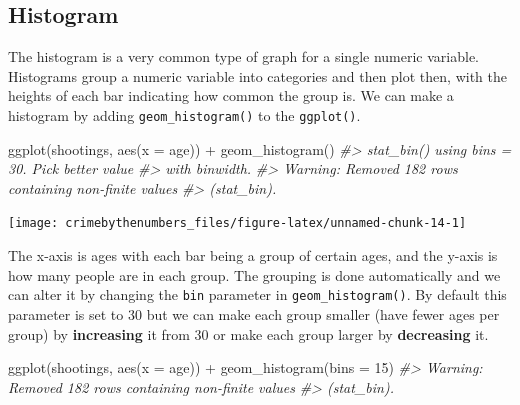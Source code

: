 \documentclass[
]{krantz}
\makeatletter
\newenvironment{Shaded}{\begin{snugshade}}{\end{snugshade}}
\newcommand{\AttributeTok}[1]{\textcolor[rgb]{0.61,0.61,0.61}{#1}}
\newcommand{\CommentTok}[1]{\textcolor[rgb]{0.37,0.37,0.37}{\textit{#1}}}
\newcommand{\DecValTok}[1]{\textcolor[rgb]{0.06,0.06,0.06}{#1}}
\newcommand{\FunctionTok}[1]{\textcolor[rgb]{0,0,0}{#1}}
\newcommand{\NormalTok}[1]{#1}
\newcommand{\SpecialCharTok}[1]{\textcolor[rgb]{0,0,0}{#1}}
\newenvironment{kframe}{%
\medskip{}
\setlength{\fboxsep}{.8em}
 \def\at@end@of@kframe{}%
 \ifinner\ifhmode%
  \def\at@end@of@kframe{\end{minipage}}%
  \begin{minipage}{\columnwidth}%
 \fi\fi%
 \def\FrameCommand##1{\hskip\@totalleftmargin \hskip-\fboxsep
 \colorbox{shadecolor}{##1}\hskip-\fboxsep
     \hskip-\linewidth \hskip-\@totalleftmargin \hskip\columnwidth}%
 \MakeFramed {\advance\hsize-\width
   \@totalleftmargin\z@ \linewidth\hsize
   \@setminipage}}%
 {\par\unskip\endMakeFramed%
 \at@end@of@kframe}
\renewenvironment{Shaded}{\begin{kframe}}{\end{kframe}}
\makeatother
\begin{document}
\hypertarget{histogram}{%
\subsection{Histogram}\label{histogram}}

The histogram is a very common type of graph for a single numeric variable. Histograms group a numeric variable into categories and then plot then, with the heights of each bar indicating how common the group is. We can make a histogram by adding \texttt{geom\_histogram()} to the \texttt{ggplot()}.

\begin{Shaded}
\begin{Highlighting}[]
\FunctionTok{ggplot}\NormalTok{(shootings, }\FunctionTok{aes}\NormalTok{(}\AttributeTok{x =}\NormalTok{ age)) }\SpecialCharTok{+} 
  \FunctionTok{geom\_histogram}\NormalTok{()}
\CommentTok{\#\textgreater{} \textasciigrave{}stat\_bin()\textasciigrave{} using \textasciigrave{}bins = 30\textasciigrave{}. Pick better value}
\CommentTok{\#\textgreater{} with \textasciigrave{}binwidth\textasciigrave{}.}
\CommentTok{\#\textgreater{} Warning: Removed 182 rows containing non{-}finite values}
\CommentTok{\#\textgreater{} (stat\_bin).}
\end{Highlighting}
\end{Shaded}

\begin{center}\texttt{[image: crimebythenumbers\_files/figure-latex/unnamed-chunk-14-1]} \end{center}

The x-axis is ages with each bar being a group of certain ages, and the y-axis is how many people are in each group. The grouping is done automatically and we can alter it by changing the \texttt{bin} parameter in \texttt{geom\_histogram()}. By default this parameter is set to 30 but we can make each group smaller (have fewer ages per group) by \textbf{increasing} it from 30 or make each group larger by \textbf{decreasing} it.

\begin{Shaded}
\begin{Highlighting}[]
\FunctionTok{ggplot}\NormalTok{(shootings, }\FunctionTok{aes}\NormalTok{(}\AttributeTok{x =}\NormalTok{ age)) }\SpecialCharTok{+} 
  \FunctionTok{geom\_histogram}\NormalTok{(}\AttributeTok{bins =} \DecValTok{15}\NormalTok{)}
\CommentTok{\#\textgreater{} Warning: Removed 182 rows containing non{-}finite values}
\CommentTok{\#\textgreater{} (stat\_bin).}
\end{Highlighting}
\end{Shaded}
\end{document}
